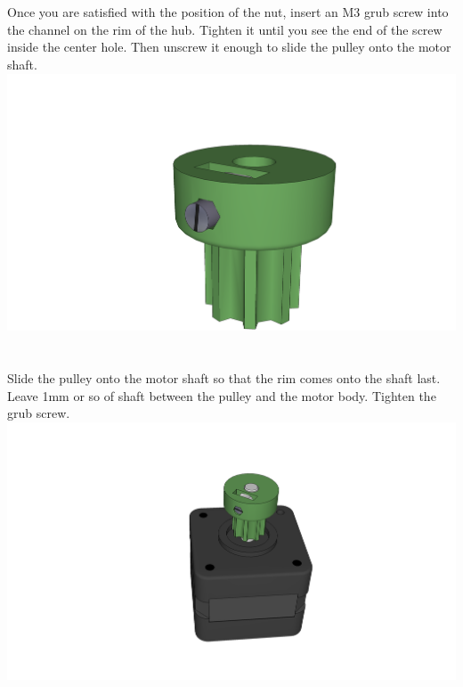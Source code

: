 \documentclass[twoside,a4paper,titlepage]{memoir}
\begin{document}
	\section{}
	Once you are satisfied with the position of the nut, insert an M3 grub screw into the channel on the rim
	of the hub. Tighten it until you see the end of the screw inside the center hole. Then unscrew it enough
	to slide the pulley onto the motor shaft.\\
	\includegraphics[width=1\linewidth]{graphics/ch9_3.png}
	
	\section{}
	Slide the pulley onto the motor shaft so that the rim comes onto the shaft last. Leave 1mm or so of shaft
	between the pulley and the motor body. Tighten the grub screw.\\
	\includegraphics[width=1\linewidth]{graphics/ch9_4.png}
	
\end{document}
